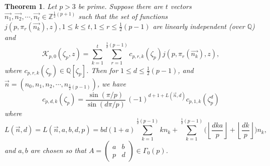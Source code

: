 \documentclass[12pt]{amsart}
\newtheorem{theorem}{Theorem}[section]
\theoremstyle{definition}
\theoremstyle{remark}
\numberwithin{equation}{section}
\newcommand\FL[1]{\left\lfloor#1\right\rfloor}
\begin{document}
\begin{theorem}
\label{thm:coeffsymmKp0}
Let $p>3$ be prime. Suppose there are $t$ vectors $\overrightarrow{n_1},\overrightarrow{n_2},\cdots,\overrightarrow{n_t}\in \mathbb{Z}^{\frac{1}{2}(p+1)}$ such that the set of functions $j(p,\pi_r(\overrightarrow{n_{k}}),z), 1\leq {k} \leq t, 1\leq r \leq \frac{1}{2}(p-1)$ are linearly independent (over $\mathbb{Q}$) and $$\mathcal{K}_{p,0}(\zeta_p,z)=\sum_{{k}=1}^t\sum_{r=1}^{\frac{1}{2}(p-1)}c_{p,r,{k}}(\zeta_p)j(p,\pi_r(\overrightarrow{n_{k}}),z),$$ where $c_{p,r,{k}}(\zeta_p) \in \mathbb{Q}[\zeta_p]$. Then for $1\leq {d} \leq \frac{1}{2}(p-1)$, and $\overrightarrow{n}=(n_0,n_1,n_2,\cdots ,n_{\frac{1}{2}(p-1)})$, we have $$c_{p,d,k}(\zeta_p)=\frac{\sin(\pi/p)}{\sin(d\pi/p)}\,(-1)^{d+1+L(\overrightarrow{n},d)}c_{p,1,k}(\zeta_p^d)$$ where $$L(\overrightarrow{n},d)=L(\overrightarrow{n},a,b,d,p)=bd(1+a)\sum\limits_{k=1}^{\frac{1}{2}(p-1)}kn_{k}+\sum\limits_{k=1}^{\frac{1}{2}(p-1)}\Big(\FL{\frac{dka}{p}}+\FL{\frac{dk}{p}}\Big) n_{k},$$ and $a,b$ are chosen so that $A = \begin{pmatrix}
      a & b \\ p & d 
    \end{pmatrix}
\in \Gamma_0(p)$.
\\
\end{theorem}
\end{document}
